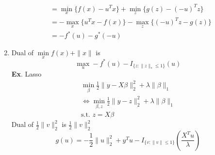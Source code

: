\documentclass[10pt]{article}
\begin{document}
\begin{enumerate}
\begin{align*}
&= \min\limits_x \{f(x) - u^T x\} + \min_z\{g(z) - (-u)^T z\}\\
&= -\max\limits_x\{u^Tx - f(x)\} - \max\limits_z\{(-u)^T z - g(z)\}\\
&= -f^*(u) - g^*(-u)
\end{align*}
\item Dual of $\min\limits_x f(x) + \|x\|$ is
\begin{equation*}
\max\limits_u - f^*(u) - I_{\{z:\|z\|_*\le 1\}}(u)
\end{equation*}
\textbf{Ex}. Lasso
\begin{align*}
\min\limits_\beta \frac{1}{2} \|y - X\beta \|_2^2 + \lambda \|\beta\|_1\\
\Longleftrightarrow \min\limits_{\beta, z}\frac{1}{2} \|y - z\|_2^2 + \lambda\|\beta\|_1\\
\text{s.t. } z = X\beta
\end{align*}
Dual of $\frac{1}{2}\|v\|_2^2$ is $\frac{1}{2} \|v\|_2^2$
\begin{equation*}
g(u) = - \frac{1}{2}\|u\|_2^2 + y^T u - I_{\{v:\|v\|\le 1\}} (\frac{X^T u}{\lambda})
\end{equation*}
\end{enumerate}




\end{document}
